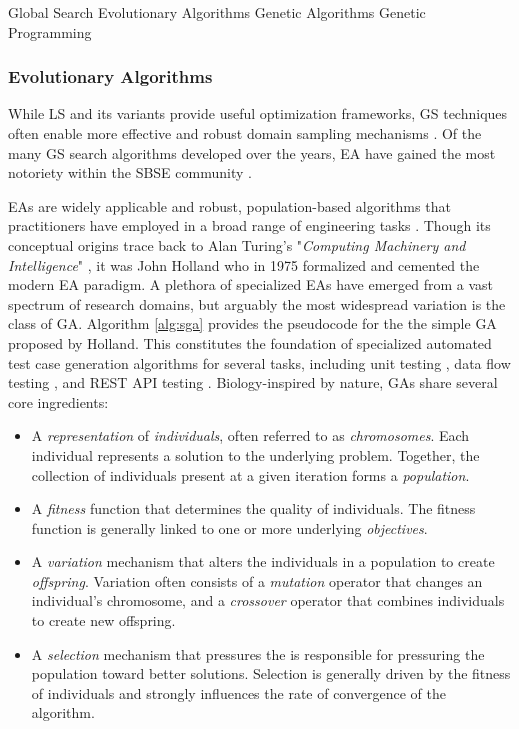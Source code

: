  {Global Search}
 {Evolutionary Algorithms}
 {Genetic Algorithms}
 {Genetic Programming}

\subsubsection{Evolutionary Algorithms}

While \gls{LS} and its variants
provide useful optimization frameworks, \Gls{GS} techniques often
enable more effective and robust domain sampling mechanisms \cite{mcminn2004search}.
Of the many \gls{GS} search algorithms developed over the years, \Gls{EA} have gained
the most notoriety within the \gls{SBSE} community \cite{harman2011software}.

\gls{EA}s are widely applicable and robust, population-based algorithms
that practitioners have employed in a broad range of engineering tasks \cite{harman2011software}.
Though its conceptual origins trace back to Alan Turing's "\textit{Computing Machinery and Intelligence}" \cite{turing1950computing}, it was John Holland \cite{jh1975adaptation}
who in 1975 formalized and cemented the modern \gls{EA} paradigm.
A plethora of specialized \gls{EA}s have emerged from a vast spectrum of 
research domains, but arguably the most widespread variation is the
class of \Gls{GA}.
Algorithm \ref{alg:sga} provides the pseudocode for the the simple \gls{GA}
proposed by Holland.
This constitutes the foundation of specialized automated test case generation algorithms
for several tasks, including unit testing 
\cite{tonella2004evolutionary, panichella2017automated},
data flow testing \cite{girgis2005automatic}, and REST API testing
\cite{arcuri2019restful}.
Biology-inspired by nature, \gls{GA}s share several core ingredients:
\begin{itemize}
\item A \textit{representation} of \textit{individuals},
	often referred to as \textit{chromosomes}.
	Each individual represents a solution to the underlying
	problem.
	Together, the collection of individuals present at
	a given iteration forms a \textit{population}.

\item A \textit{fitness} function that determines
	the quality of individuals. 
	The fitness function is generally linked
	to one or more underlying \textit{objectives}.

\item A \textit{variation} mechanism that alters
	the individuals in a population to create \textit{offspring}.
	Variation often consists of a \textit{mutation} operator
	that changes an individual's chromosome, and a \textit{crossover}
	operator that combines individuals to create new offspring.
	
\item A \textit{selection} mechanism that pressures the is responsible
	for pressuring the population toward better solutions. Selection
	is generally driven by the fitness of individuals and strongly
	influences the rate of convergence of the algorithm.
\end{itemize}

